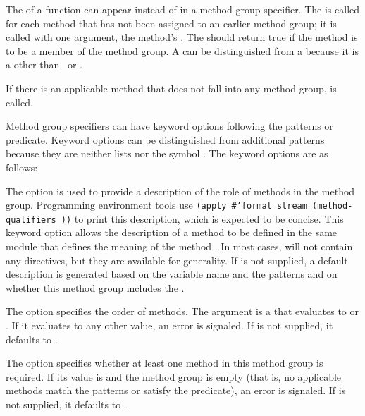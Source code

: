 The  of a  function can appear instead of 
 in a method group specifier.  
The  is called for
each method that has not been assigned to an earlier method group; it
is called with one argument, the method's  .
The  should return true if the method is to be a member of the
method group.  A  can be distinguished from a 
because it is a  other than \nil\ or \misc{*}.
 
 
If there is an applicable method that does not fall into any method group,
 is called.
 
Method group specifiers can have keyword options following the
 patterns or predicate.  Keyword options can be distinguished from
additional  patterns because they are neither lists nor the symbol
\misc{*}.  The keyword options are as follows:
 
\beginlist
 
\itemitem{\bull}
The  option is used to provide a description of the
role of methods in the method group.  Programming environment tools
use
 {\tt (apply \#'format stream  (method-qualifiers ))}
to print this description, which
is expected to be concise.  This keyword
option allows the description of a method  to be defined in
the same module that defines the meaning of the 
method .  In most cases,  will not contain any
 directives, but they are available for generality.  
If  is not supplied, a default description is generated
based on the variable name and the  patterns and on whether
this method group includes the .  
 
\itemitem{\bull}
The  option specifies the order of methods.  The 
argument is a  that evaluates to 
 or .  If it evaluates
to any other value, an error is signaled.  
If  is not supplied, it defaults to 
.
                                 
\itemitem{\bull}
The  option specifies whether at least one method in
this method group is required.
If its value is  and the method group is empty 
(that is, no applicable methods match the  patterns
or satisfy the predicate), 
an error is signaled.  
If  is not supplied,
it defaults to \nil.  
 
